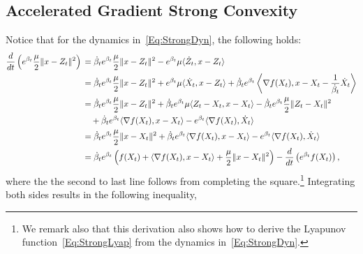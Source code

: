 \documentclass[11pt]{article}
\theoremstyle{plain}
\begin{document}
\subsection{Accelerated Gradient Strong Convexity}
Notice that for the dynamics in~\eqref{Eq:StrongDyn}, the following holds:
\begin{align}\label{Eq:Strong}
 \frac{d}{dt}\left(e^{\beta_t}\frac{\mu}{2} \|x - Z_t\|^2\right)\, &=  \dot \beta_t e^{\beta_t} \frac{\mu}{2} \|x - Z_t\|^2 - e^{\beta_t} \mu\langle \dot Z_t, x - Z_t\rangle \notag\\
 &=  \dot \beta_t e^{\beta_t} \frac{\mu}{2} \|x - Z_t\|^2 + e^{\beta_t} \mu\langle \dot X_t, x - Z_t\rangle  + \dot  \beta_t e^{\beta_t} \left\langle \nabla f(X_t), x - X_t - \frac{1}{\dot \beta_t} \dot X_t\right\rangle \notag \\
  &=\dot  \beta_t e^{\beta_t} \frac{\mu}{2} \|x - Z_t\|^2 + \dot \beta_te^{\beta_t} \mu\langle  Z_t - X_t, x - X_t \rangle - \dot \beta_te^{\beta_t} \frac{\mu}{2}\| Z_t - X_t\|^2 \notag\\
 &\quad + \dot \beta_t e^{\beta_t} \langle \nabla f(X_t), x - X_t \rangle  - e^{\beta_t} \langle \nabla f(X_t),\dot X_t\rangle \notag\\
 & =  \dot \beta_t e^{\beta_t} \frac{\mu}{2} \|x - X_t\|^2 + \dot \beta_t e^{\beta_t} \langle \nabla f(X_t), x - X_t \rangle   - e^{\beta_t} \langle \nabla f(X_t),\dot X_t\rangle \notag \\
 &=   \dot \beta_t e^{\beta_t}\left( f(X_t) + \langle \nabla f(X_t), x - X_t \rangle+ \frac{\mu}{2} \|x - X_t\|^2\right)   -  \frac{d}{dt}\left( e^{ \beta_t}  f(X_t)\right),
\end{align}
where the the second to last line follows from completing the square.\footnote{We remark also that this derivation also shows how to derive the Lyapunov function~\eqref{Eq:StrongLyap} from the dynamics in~\eqref{Eq:StrongDyn}.} %
 Integrating both sides results in the following inequality, 
\end{document}
